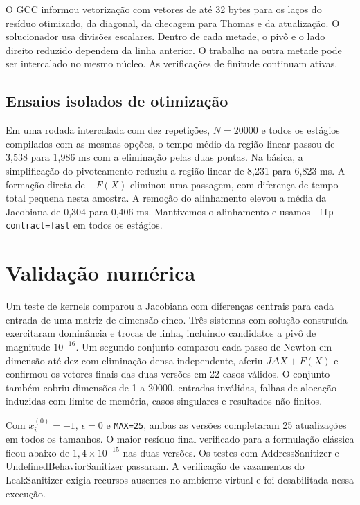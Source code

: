 \documentclass[11pt,a4paper]{article}
\begin{document}
O GCC informou vetorização com vetores de até 32 bytes para os laços do resíduo otimizado, da diagonal, da checagem para Thomas e da atualização. O solucionador usa divisões escalares. Dentro de cada metade, o pivô e o lado direito reduzido dependem da linha anterior. O trabalho na outra metade pode ser intercalado no mesmo núcleo. As verificações de finitude continuam ativas.

\subsection{Ensaios isolados de otimização}

Em uma rodada intercalada com dez repetições, $N=20000$ e todos os estágios compilados com as mesmas opções, o tempo médio da região linear passou de 3,538 para 1,986 ms com a eliminação pelas duas pontas. Na básica, a simplificação do pivoteamento reduziu a região linear de 8,231 para 6,823 ms. A formação direta de $-F(X)$ eliminou uma passagem, com diferença de tempo total pequena nesta amostra. A remoção do alinhamento elevou a média da Jacobiana de 0,304 para 0,406 ms. Mantivemos o alinhamento e usamos \texttt{-ffp-contract=fast} em todos os estágios.

\section{Validação numérica}

Um teste de kernels comparou a Jacobiana com diferenças centrais para cada entrada de uma matriz de dimensão cinco. Três sistemas com solução construída exercitaram dominância e trocas de linha, incluindo candidatos a pivô de magnitude $10^{-16}$. Um segundo conjunto comparou cada passo de Newton em dimensão até dez com eliminação densa independente, aferiu $J\Delta X+F(X)$ e confirmou os vetores finais das duas versões em 22 casos válidos. O conjunto também cobriu dimensões de 1 a 20000, entradas inválidas, falhas de alocação induzidas com limite de memória, casos singulares e resultados não finitos.

Com $x_i^{(0)}=-1$, $\epsilon=0$ e \texttt{MAX=25}, ambas as versões completaram 25 atualizações em todos os tamanhos. O maior resíduo final verificado para a formulação clássica ficou abaixo de $1{,}4\times 10^{-15}$ nas duas versões. Os testes com AddressSanitizer e UndefinedBehaviorSanitizer passaram. A verificação de vazamentos do LeakSanitizer exigia recursos ausentes no ambiente virtual e foi desabilitada nessa execução.
\end{document}
